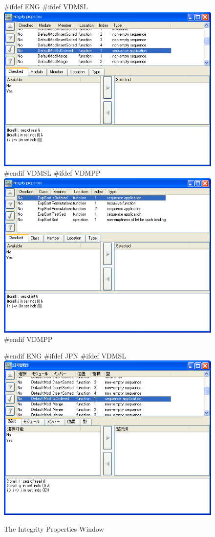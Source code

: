 \documentclass[\pformat,12pt]{article}
\begin{document}
\begin{figure}[tbh]
\begin{center}
#ifdef ENG
#ifdef VDMSL
\includegraphics[width=12.5cm]{integWin-slENG.png}
#endif VDMSL
#ifdef VDMPP
\includegraphics[width=12.5cm]{integWin-ppENG.png}
#endif VDMPP
\caption{The Integrity Properties Window}
#endif ENG
#ifdef JPN
#ifdef VDMSL
\includegraphics[width=12.5cm]{integWin-sl.png}

\end{center}
\end{figure}
\end{document}
